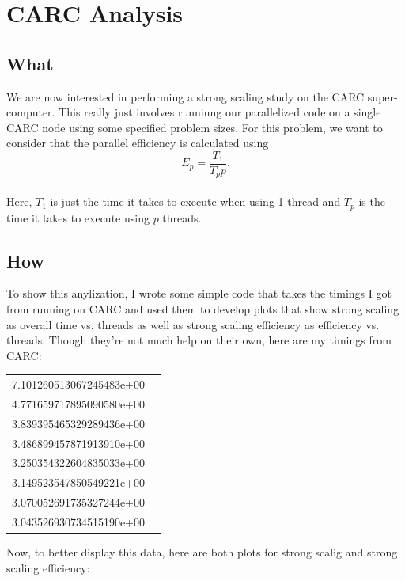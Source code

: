 \documentclass[12pt]{article}
\begin{document}
\section{CARC Analysis}
\subsection{What}
We are now interested in performing a strong scaling study on the CARC super-computer. This really just involves runninng our parallelized code on a single CARC node using some specified problem sizes. For this problem, we want to consider that the parallel efficiency is calculated using
\[
E_p = \frac{T_1}{T_p p}.
\]
\\
\noindent Here, $T_1$ is just the time it takes to execute when using 1 thread and $T_p$ is the time it takes to execute using $p$ threads.
\subsection{How}
To show this anylization, I wrote some simple code that takes the timings I got from running on CARC and used them to develop plots that show strong scaling as overall time vs. threads as well as strong scaling efficiency as efficiency vs. threads. Though they're not much help on their own, here are my timings from CARC:

\begin{table}[h]
    \centering
    \begin{tabular}{ll} %
        \toprule
        7.101260513067245483e+00 \\
        4.771659717895090580e+00 \\
        3.839395465329289436e+00 \\
        3.486899457871913910e+00 \\
        3.250354322604835033e+00 \\
        3.149523547850549221e+00 \\
        3.070052691735327244e+00 \\ 
        3.043526930734515190e+00 \\
        \bottomrule
    \end{tabular}
\end{table}

\noindent Now, to better display this data, here are both plots for strong scalig and strong scaling efficiency:
\end{document}
